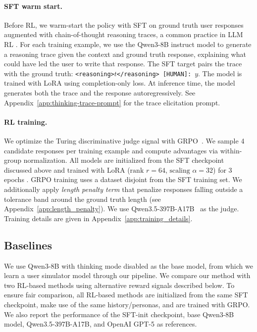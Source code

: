 \documentclass[11pt]{article}
\newcommand{\llq}[1]{{\color{cyan}[linlu: #1]}}
\begin{document}
\paragraph{SFT warm start.}
Before RL, we warm-start the policy with SFT on ground truth user responses augmented with chain-of-thought reasoning traces, a common practice in LLM RL \cite[e.g.,][]{guo2025deepseek}. For each training example, we use the Qwen3-8B instruct model to generate a reasoning trace given the context and ground truth response, explaining what could have led the user to write that response. The SFT target pairs the trace with the ground truth: \texttt{<reasoning>}$t$\texttt{</reasoning> [HUMAN]:}~$y$. The model is trained with LoRA using completion-only loss. At inference time, the model generates both the trace and the response autoregressively. See Appendix~\ref{app:thinking-trace-prompt} for the trace elicitation prompt.

\paragraph{RL training.}
We optimize the Turing discriminative judge signal with GRPO~\citep{shao2024deepseekmath}. We sample 4 candidate responses per training example and compute advantages via within-group normalization. All models are initialized from the SFT checkpoint discussed above and trained with LoRA ($\text{rank }{r=}64$, $\text{scaling }\alpha{=}32$) for 3 epochs \citep{lora, qlora}. GRPO training uses a dataset disjoint from the SFT training set.
We  additionally apply \emph{length penalty term} that penalize responses falling outside a tolerance band around the ground truth length (see Appendix~\ref{app:length_penalty}). We use Qwen3.5-397B-A17B~\citep{qwenteam2026qwen35omni} as the judge. Training details are given in Appendix~\ref{app:training_details}. 

\subsection{Baselines}

We use Qwen3-8B with thinking mode disabled as the base model, from which we learn a user simulator model through our pipeline. We compare our method with two RL-based methods using alternative reward signals described below. To ensure fair comparison, all RL-based methods are initialized from the same SFT checkpoint, make use of the same history/personas, and are trained with GRPO. We also report the performance of the SFT-init checkpoint, base Qwen3-8B model, Qwen3.5-397B-A17B, and OpenAI GPT-5 as references.
\end{document}
